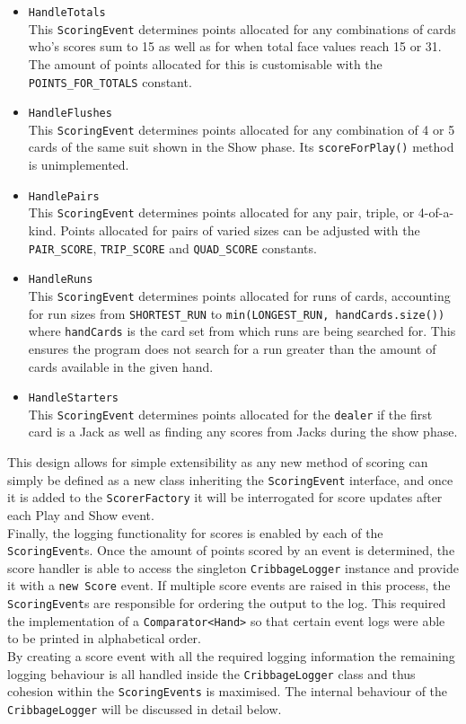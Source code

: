\documentclass{article}
\begin{document}
\begin{multicols}{2}
    \begin{itemize}
        \item \verb|HandleTotals|\\[2mm]
        This \verb|ScoringEvent| determines points allocated for any combinations of cards who's scores sum to 15 as well as for when total face values reach 15 or 31. The amount of points allocated for this is customisable with the \verb|POINTS_FOR_TOTALS| constant.
        \item \verb|HandleFlushes|\\[2mm]
        This \verb|ScoringEvent| determines points allocated for any combination of 4 or 5 cards of the same suit shown in the Show phase. Its \verb|scoreForPlay()| method is unimplemented.
        \item \verb|HandlePairs|\\[2mm]
        This \verb|ScoringEvent| determines points allocated for any pair, triple, or 4-of-a-kind. Points allocated for pairs of varied sizes can be adjusted with the \verb|PAIR_SCORE|, \verb|TRIP_SCORE| and \verb|QUAD_SCORE| constants.
        \item \verb|HandleRuns|\\[2mm]
        This \verb|ScoringEvent| determines points allocated for runs of cards, accounting for run sizes from \verb|SHORTEST_RUN| to \verb|min(LONGEST_RUN, handCards.size())| where \verb|handCards| is the card set from which runs are being searched for. This ensures the program does not search for a run greater than the amount of cards available in the given hand.
        \item \verb|HandleStarters|\\[2mm]
        This \verb|ScoringEvent| determines points allocated for the \verb|dealer| if the first card is a Jack as well as finding any scores from Jacks during the show phase.
    \end{itemize}
\end{multicols}
\noindent This design allows for simple extensibility as any new method of scoring can simply be defined as a new class inheriting the \verb|ScoringEvent| interface, and once it is added to the \verb|ScorerFactory| it will be interrogated for score updates after each Play and Show event.\\[2mm]
Finally, the logging functionality for scores is enabled by each of the \verb|ScoringEvent|s. Once the amount of points scored by an event is determined, the score handler is able to access the singleton \verb|CribbageLogger| instance and provide it with a \verb|new Score| event. If multiple score events are raised in this process, the \verb|ScoringEvent|s are responsible for ordering the output to the log. This required the implementation of a \verb|Comparator<Hand>| so that certain event logs were able to be printed in alphabetical order.\\[2mm]
By creating a score event with all the required logging information the remaining logging behaviour is all handled inside the \verb|CribbageLogger| class and thus cohesion within the \verb|ScoringEvents| is maximised. The internal behaviour of the \verb|CribbageLogger| will be discussed in detail below.
\end{document}
